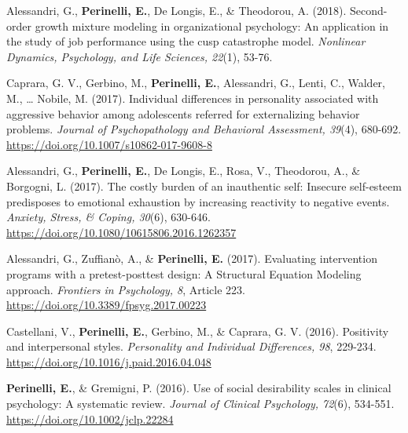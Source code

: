 \documentclass[hidelinks, letterpaper,10pt]{article} %
\begin{document}
\begin{etaremune}
\item Alessandri, G., \textbf{Perinelli, E.}, De Longis, E., \& Theodorou, A. (2018). Second-order growth mixture modeling in organizational psychology: An application in the study of job performance using the cusp catastrophe model. \textit{Nonlinear Dynamics, Psychology, and Life Sciences, 22}(1), 53-76.

\item Caprara, G. V., Gerbino, M., \textbf{Perinelli, E.}, Alessandri, G., Lenti, C., Walder, M., … Nobile, M. (2017). Individual differences in personality associated with aggressive behavior among adolescents referred for externalizing behavior problems. \textit{Journal of Psychopathology and Behavioral Assessment, 39}(4), 680-692. \url{https://doi.org/10.1007/s10862-017-9608-8} 

\item Alessandri, G., \textbf{Perinelli, E.}, De Longis, E., Rosa, V., Theodorou, A., \& Borgogni, L. (2017). The costly burden of an inauthentic self: Insecure self-esteem predisposes to emotional exhaustion by increasing reactivity to negative events. \textit{Anxiety, Stress, \& Coping, 30}(6), 630-646. \url{https://doi.org/10.1080/10615806.2016.1262357} 

\item Alessandri, G., Zuffianò, A., \& \textbf{Perinelli, E.} (2017). Evaluating intervention programs with a pretest-posttest design: A Structural Equation Modeling approach. \textit{Frontiers in Psychology, 8}, Article 223. \url{https://doi.org/10.3389/fpsyg.2017.00223} 

\item Castellani, V., \textbf{Perinelli, E.}, Gerbino, M., \& Caprara, G. V. (2016). Positivity and interpersonal styles. \textit{Personality and Individual Differences, 98}, 229-234. \url{https://doi.org/10.1016/j.paid.2016.04.048} 

\item \textbf{Perinelli, E.}, \& Gremigni, P. (2016). Use of social desirability scales in clinical psychology: A systematic review. \textit{Journal of Clinical Psychology, 72}(6), 534-551. \url{https://doi.org/10.1002/jclp.22284} 

	\end{etaremune}
\vspace{3mm}
\end{document}
